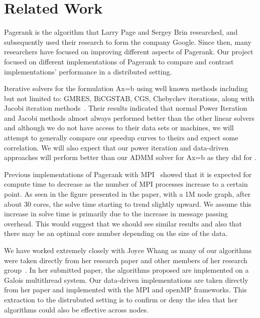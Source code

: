 \documentclass[letterpaper,11pt,onecolumn]{article}
\begin{document}
\section{Related Work}

Pagerank is the algorithm that Larry Page and Sergey Brin researched, and subsequently used their research to form the company Google. Since then, many researchers have focused on improving different aspects of Pagerank. Our project focused on different implementations of Pagerank to compare and contrast implementations' performance in a distributed setting. 

Iterative solvers for the formulation Ax=b using well known methods including but not limited to: GMRES, BiCGSTAB, CGS, Chebychev iterations, along with Jacobi iteration methods~\cite{FastParallel}. Their results indicated that normal Power Iteration and Jacobi methods almost always performed better than the other linear solvers and although we do not have access to their data sets or machines, we will attempt to generally compare our speedup curves to theirs and expect some correlation. We will also expect that our power iteration and data-driven approaches will perform better than our ADMM solver for Ax=b as they did for \cite{FastParallel}.
 
Previous implementations of Pagerank with MPI~\cite{MPIPR} showed that it is expected for compute time to decrease as the number of MPI processes increase to a certain point. As seen in the figure presented in the paper, with a 1M node graph, after about 30 cores, the solve time starting to trend slightly upward. We assume this increase in solve time is primarily due to the increase in message passing overhead. This would suggest that we should see similar results and also that there may be an optimal core number depending on the size of the data. 

We have worked extremely closely with Joyce Whang as many of our algorithms were taken directly from her research paper and other members of her research group~\cite{Joyce}. In her submitted paper, the algorithms proposed are implemented on a Galois multithread system. Our data-driven implementations are taken directly from her paper and implemented with the MPI and openMP frameworks. This extraction to the distrubuted setting is to confirm or deny the idea that her algorithms could also be effective across nodes.
\end{document}
